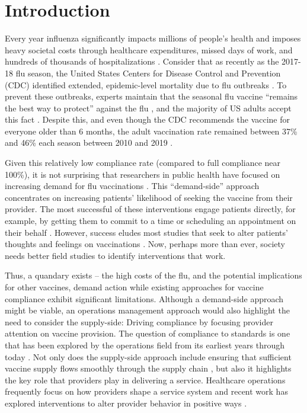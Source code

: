 
\section{Introduction} 
 Every year influenza significantly impacts millions of people’s health and imposes heavy societal costs through healthcare expenditures, missed days of work, and hundreds of thousands of hospitalizations \citep{Molinari2007,CDC2020a}. Consider that as recently as the 2017-18 flu season, the United States Centers for Disease Control and Prevention (CDC) identified extended, epidemic-level mortality due to flu outbreaks \citep{Garten2018}. To prevent these outbreaks, experts maintain that the seasonal flu vaccine “remains the best way to protect” against the flu \citep[p. 544]{Xu2019}, and the majority of US adults accept this fact \citep{NationalFoundationforInfectionsDiseasesNFID2019}. Despite this, and even though the CDC recommends the vaccine for everyone older than 6 months, the adult vaccination rate remained between 37\% and 46\% each season between 2010 and 2019 \citep{CDC2019}.
 
 Given this relatively low compliance rate (compared to full compliance near 100\%), it is not surprising that researchers in public health have focused on increasing demand for flu vaccinations \citep{Brewer2017}. This “demand-side” approach concentrates on increasing patients’ likelihood of seeking the vaccine from their provider. The most successful of these interventions engage patients directly, for example, by getting them to commit to a time \citep{Milkman2011} or scheduling an appointment on their behalf \citep{Chapman2016}. However, success eludes most studies that seek to alter patients’ thoughts and feelings on vaccinations \citep{Brewer2017}. Now, perhaps more than ever, society needs better field studies to identify interventions that work.
 
 Thus, a quandary exists – the high costs of the flu, and the potential implications for other vaccines, demand action while existing approaches for vaccine compliance exhibit significant limitations. Although a demand-side approach might be viable, an operations management approach would also highlight the need to consider the supply-side: Driving compliance by focusing provider attention on vaccine provision. The question of compliance to standards is one that has been explored by the operations field from its earliest years \citep{Taylor1911} through today \citep{Corbett2005,Andritsos2014,Senot2016,Staats2017}. Not only does the supply-side approach include ensuring that sufficient vaccine supply flows smoothly through the supply chain \citep{Deo2009,Cho2010,Arifoglu2012}, but also it highlights the key role that providers play in delivering a service. Healthcare operations frequently focus on how providers shape a service system \citep[e.g.,][]{Tucker2007,Freeman2017} and recent work has explored interventions to alter provider behavior in positive ways \citep{Tsai2015,Song2016,Dai2017,Song2018a}. 
 
